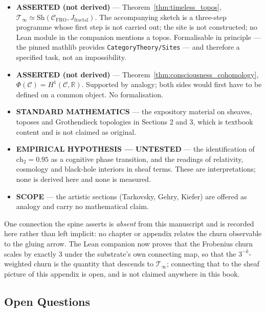 \begin{itemize}
\item \textbf{ASSERTED (not derived)} --- Theorem~\ref{thm:timeless_topos},
  $\mathcal{T}_\infty \simeq \text{Sh}(\mathcal{C}_{\text{FRO}},
  J_{\text{fractal}})$. The accompanying sketch is a three-step programme whose
  first step is not carried out; the site is not constructed; no Lean module in
  the companion mentions a topos. Formalisable in principle --- the pinned
  mathlib provides \texttt{CategoryTheory/Sites} --- and therefore a specified
  task, not an impossibility.
\item \textbf{ASSERTED (not derived)} ---
  Theorem~\ref{thm:consciousness_cohomology}, $\Phi(\mathcal{C}) =
  H^1(\mathcal{C}, \mathbb{R})$. Supported by analogy; both sides would first
  have to be defined on a common object. No formalisation.
\item \textbf{STANDARD MATHEMATICS} --- the expository material on sheaves,
  toposes and Grothendieck topologies in Sections 2 and 3, which is textbook
  content and is not claimed as original.
\item \textbf{EMPIRICAL HYPOTHESIS --- UNTESTED} --- the identification of
  $\text{ch}_2 = 0.95$ as a cognitive phase transition, and the readings of
  relativity, cosmology and black-hole interiors in sheaf terms. These are
  interpretations; none is derived here and none is measured.
\item \textbf{SCOPE} --- the artistic sections (Tarkovsky, Gehry, Kiefer) are
  offered as analogy and carry no mathematical claim.
\end{itemize}

One connection the spine asserts is \emph{absent} from this manuscript and is
recorded here rather than left implicit: no chapter or appendix relates the
churn observable to the gluing arrow. The Lean companion now proves that the
Frobenius churn scales by exactly $3$ under the substrate's own connecting map,
so that the $3^{-k}$-weighted churn is the quantity that descends to
$\mathcal{T}_\infty$; connecting that to the sheaf picture of this appendix is
open, and is not claimed anywhere in this book.

\subsection{Open Questions}


